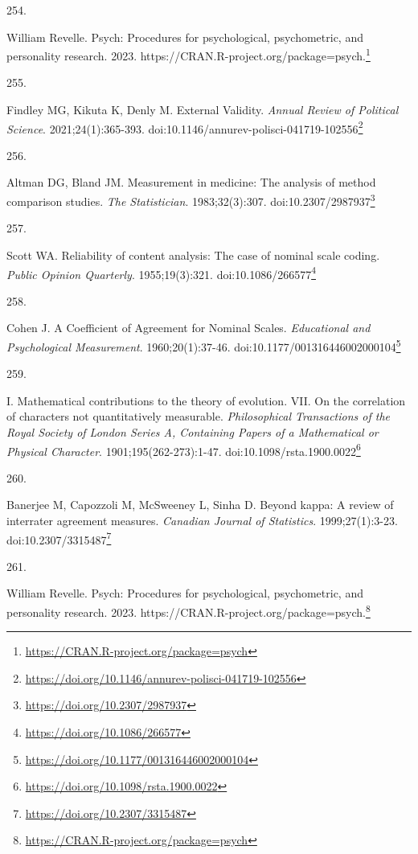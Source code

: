 \documentclass[
  a4paper,
]{book}
\newlength{\cslhangindent}
\newlength{\csllabelwidth}
\newlength{\cslentryspacingunit} %
\newenvironment{CSLReferences}[2] %
 {%
  \setlength{\parindent}{0pt}
  \ifodd #1
  \let\oldpar\par
  \def\par{\hangindent=\cslhangindent\oldpar}
  \fi
  \setlength{\parskip}{#2\cslentryspacingunit}
 }%
 {}
\newcommand{\CSLLeftMargin}[1]{\parbox[t]{\csllabelwidth}{#1}}
\newcommand{\CSLRightInline}[1]{\parbox[t]{\linewidth - \csllabelwidth}{#1}\break}
\renewcommand{\href}[2]{#2\footnote{\url{#1}}}
\begin{document}
\begin{CSLReferences}{0}{0}
\leavevmode{}%
\CSLLeftMargin{254. }%
\CSLRightInline{William Revelle. Psych: Procedures for psychological, psychometric, and personality research. 2023. \href{https://CRAN.R-project.org/package=psych}{https://CRAN.R-project.org/package=psych.}}

\leavevmode{}%
\CSLLeftMargin{255. }%
\CSLRightInline{Findley MG, Kikuta K, Denly M. External Validity. \emph{Annual Review of Political Science}. 2021;24(1):365-393. doi:\href{https://doi.org/10.1146/annurev-polisci-041719-102556}{10.1146/annurev-polisci-041719-102556}}

\leavevmode{}%
\CSLLeftMargin{256. }%
\CSLRightInline{Altman DG, Bland JM. Measurement in medicine: The analysis of method comparison studies. \emph{The Statistician}. 1983;32(3):307. doi:\href{https://doi.org/10.2307/2987937}{10.2307/2987937}}

\leavevmode{}%
\CSLLeftMargin{257. }%
\CSLRightInline{Scott WA. Reliability of content analysis: The case of nominal scale coding. \emph{Public Opinion Quarterly}. 1955;19(3):321. doi:\href{https://doi.org/10.1086/266577}{10.1086/266577}}

\leavevmode{}%
\CSLLeftMargin{258. }%
\CSLRightInline{Cohen J. A Coefficient of Agreement for Nominal Scales. \emph{Educational and Psychological Measurement}. 1960;20(1):37-46. doi:\href{https://doi.org/10.1177/001316446002000104}{10.1177/001316446002000104}}

\leavevmode{}%
\CSLLeftMargin{259. }%
\CSLRightInline{I. Mathematical contributions to the theory of evolution. {\textemdash}VII. On the correlation of characters not quantitatively measurable. \emph{Philosophical Transactions of the Royal Society of London Series A, Containing Papers of a Mathematical or Physical Character}. 1901;195(262-273):1-47. doi:\href{https://doi.org/10.1098/rsta.1900.0022}{10.1098/rsta.1900.0022}}

\leavevmode{}%
\CSLLeftMargin{260. }%
\CSLRightInline{Banerjee M, Capozzoli M, McSweeney L, Sinha D. Beyond kappa: A review of interrater agreement measures. \emph{Canadian Journal of Statistics}. 1999;27(1):3-23. doi:\href{https://doi.org/10.2307/3315487}{10.2307/3315487}}

\leavevmode{}%
\CSLLeftMargin{261. }%
\CSLRightInline{William Revelle. Psych: Procedures for psychological, psychometric, and personality research. 2023. \href{https://CRAN.R-project.org/package=psych}{https://CRAN.R-project.org/package=psych.}}


\end{CSLReferences}
\end{document}
